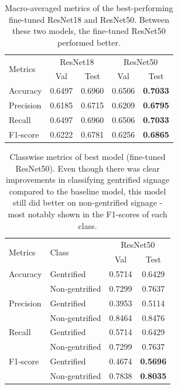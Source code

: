 \begin{table}[h!]
    \begin{tabular}{lcccc}
    \toprule
\multirow{2}{*}{Metrics} & \multicolumn{2}{c}{ResNet18} & \multicolumn{2}{c}{ResNet50} \\ \cmidrule(lr){2-3} \cmidrule(lr){4-5}
                         & Val           & Test          & Val           & Test         \\ \hline
Accuracy                 & 0.6497        & 0.6960        & 0.6506        & \textbf{0.7033}       \\
Precision                & 0.6185        & 0.6715        & 0.6209        & \textbf{0.6795}       \\
Recall                   & 0.6497        & 0.6960        & 0.6506        & \textbf{0.7033}       \\
F1-score                 & 0.6222        & 0.6781        & 0.6256        & \textbf{0.6865}       \\ \bottomrule
    \end{tabular}
    \caption{Macro-averaged metrics of the best-performing fine-tuned ResNet18 and ResNet50. Between these two models, the fine-tuned ResNet50 performed better.}
    \label{fig:resnet_compare}
\end{table}


\begin{table}[h!]
\begin{tabular}{llcc}
\toprule
\multirow{2}{*}{Metrics}   & \multirow{2}{*}{Class} & \multicolumn{2}{c}{ResNet50} \\ \cline{3-4} 
                           &                        & Val           & Test         \\ \hline
Accuracy                   & Gentrified             & 0.5714        & 0.6429       \\
                           & Non-gentrified         & 0.7299        & 0.7637       \\
Precision                  & Gentrified             & 0.3953        & 0.5114       \\
                           & Non-gentrified         & 0.8464        & 0.8476       \\
Recall                     & Gentrified             & 0.5714        & 0.6429       \\
                           & Non-gentrified         & 0.7299        & 0.7637       \\
F1-score                   & Gentrified             & 0.4674        & \textbf{0.5696}       \\
                           & Non-gentrified         & 0.7838        & \textbf{0.8035}       \\
\bottomrule
\end{tabular}
\caption{Classwise metrics of best model (fine-tuned ResNet50). Even though there was clear improvements in classifying gentrified signage compared to the baseline model, this model still did better on non-gentrified signage - most notably shown in the F1-scores of each class.}
\label{fig:resnet50_cls}
\end{table}

